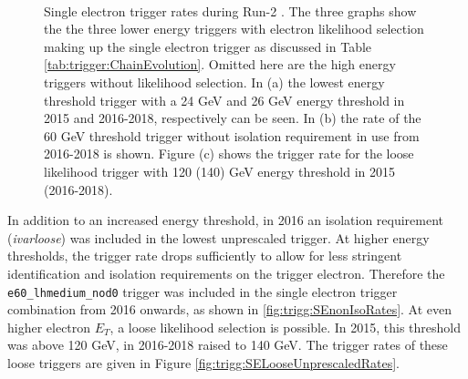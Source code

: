 \begin{figure}[h]
      \centering
{}
\\
\caption{Single electron trigger rates during Run-2 \label{fig:trigg:OverallRates} \cite{TrigEgammaPaper}. The three graphs show the the three lower energy triggers with electron likelihood selection making up the single electron trigger as discussed in Table \ref{tab:trigger:ChainEvolution}. Omitted here are the high energy triggers without likelihood selection.  In (a) the lowest energy threshold trigger with a 24 GeV and 26 GeV energy threshold in 2015 and 2016-2018, respectively can be seen.  In (b) the rate of the 60 GeV threshold trigger without isolation requirement in use from 2016-2018 is shown.  Figure (c) shows the trigger rate for the loose likelihood trigger with 120 (140) GeV energy threshold in 2015 (2016-2018). }
\end{figure}

In addition to an increased energy threshold,  in 2016 an isolation requirement (\textit{ivarloose}) was included in the lowest unprescaled trigger.  At higher energy thresholds,  the trigger rate drops sufficiently to allow for less stringent identification and isolation requirements on the trigger electron.  Therefore the \texttt{e60\_lhmedium\_nod0} trigger was  included in the single electron trigger combination from 2016 onwards,  as shown in \ref{fig:trigg:SEnonIsoRates}.  At even higher electron $E_T$,  a loose likelihood selection is possible.  In 2015, this threshold was above 120 GeV,  in 2016-2018 raised to 140 GeV.  The trigger rates of these loose triggers are given in Figure  \ref{fig:trigg:SELooseUnprescaledRates}.\\ 


